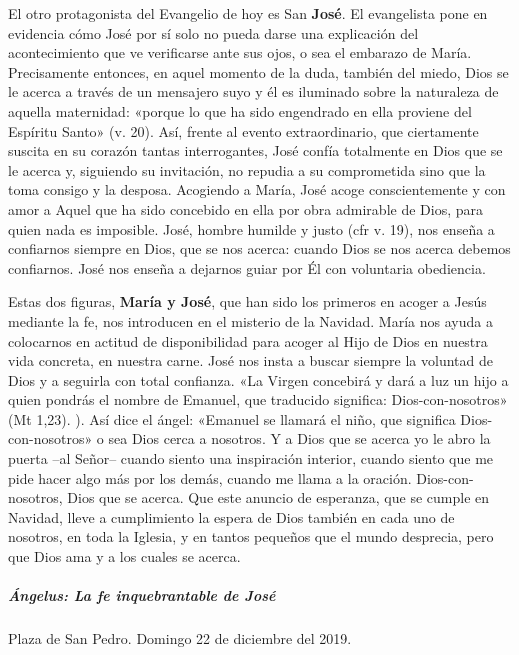 \documentclass[]{article}
\let\oldsubparagraph\subparagraph
\renewcommand{\subparagraph}[1]{\oldsubparagraph{#1}\mbox{}}
\begin{document}
El otro protagonista del Evangelio de hoy es San \textbf{José}. El
evangelista pone en evidencia cómo José por sí solo no pueda darse una
explicación del acontecimiento que ve verificarse ante sus ojos, o sea
el embarazo de María. Precisamente entonces, en aquel momento de la
duda, también del miedo, Dios se le acerca a través de un mensajero suyo
y él es iluminado sobre la naturaleza de aquella maternidad: «porque lo
que ha sido engendrado en ella proviene del Espíritu Santo» (v. 20).
Así, frente al evento extraordinario, que ciertamente suscita en su
corazón tantas interrogantes, José confía totalmente en Dios que se le
acerca y, siguiendo su invitación, no repudia a su comprometida sino que
la toma consigo y la desposa. Acogiendo a María, José acoge
conscientemente y con amor a Aquel que ha sido concebido en ella por
obra admirable de Dios, para quien nada es imposible. José, hombre
humilde y justo (cfr v. 19), nos enseña a confiarnos siempre en Dios,
que se nos acerca: cuando Dios se nos acerca debemos confiarnos. José
nos enseña a dejarnos guiar por Él con voluntaria obediencia.

Estas dos figuras, \textbf{María y José}, que han sido los primeros en
acoger a Jesús mediante la fe, nos introducen en el misterio de la
Navidad. María nos ayuda a colocarnos en actitud de disponibilidad para
acoger al Hijo de Dios en nuestra vida concreta, en nuestra carne. José
nos insta a buscar siempre la voluntad de Dios y a seguirla con total
confianza. «La Virgen concebirá y dará a luz un hijo a quien pondrás el
nombre de Emanuel, que traducido significa: Dios-con-nosotros» (Mt
1,23). ). Así dice el ángel: «Emanuel se llamará el niño, que significa
Dios-con-nosotros» o sea Dios cerca a nosotros. Y a Dios que se acerca
yo le abro la puerta --al Señor-- cuando siento una inspiración
interior, cuando siento que me pide hacer algo más por los demás, cuando
me llama a la oración. Dios-con-nosotros, Dios que se acerca. Que este
anuncio de esperanza, que se cumple en Navidad, lleve a cumplimiento la
espera de Dios también en cada uno de nosotros, en toda la Iglesia, y en
tantos pequeños que el mundo desprecia, pero que Dios ama y a los cuales
se acerca.

\subparagraph{Ángelus: La fe inquebrantable de
José}\label{uxe1ngelus-la-fe-inquebrantable-de-josuxe9}

Plaza de San Pedro. Domingo 22 de diciembre del 2019.
\end{document}
